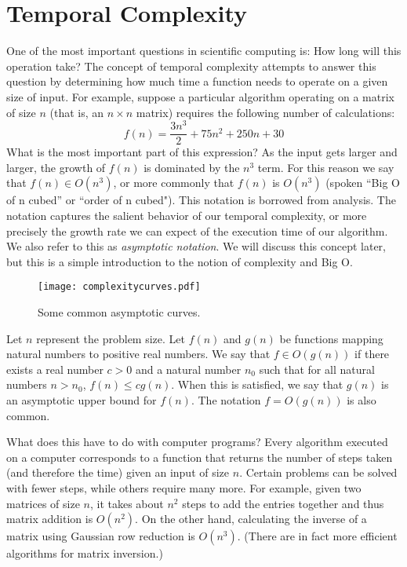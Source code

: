 

\section*{Temporal Complexity}
One of the most important questions in scientific computing is:
How long will this operation take?
The concept of temporal complexity attempts to answer this question by determining
how much time a function needs to operate on a given size of input.
For example, suppose a particular algorithm operating on a matrix of size $n$
(that is, an $n \times n$ matrix)
requires the following number of calculations:
\begin{equation*}
f(n) = \frac{3n^3}{2} + 75n^2 + 250n + 30
\end{equation*}
What is the most important part of this expression?
As the input gets larger and larger, the growth of $f(n)$ is dominated by the $n^3$ term.
For this reason we say that $f(n) \in O(n^3)$, or more commonly that $f(n)$ is $O(n^3)$
(spoken ``Big O of n cubed'' or ``order of n cubed").
This notation is borrowed from analysis. The notation captures the salient behavior of our temporal complexity,
or more precisely the growth rate we can expect of the execution time of our algorithm.
We also refer to this as \emph{asymptotic notation}.
We will discuss this concept later, but this is a simple introduction to the notion of complexity and Big O.
\begin{figure}[h]
\centering
\texttt{[image: complexitycurves.pdf]}
\caption{Some common asymptotic curves.}
\end{figure}

\begin{definition}
Let $n$ represent the problem size.  Let $f(n)$ and $g(n)$ be functions mapping natural numbers to positive real numbers. We say that $f \in O(g(n))$ if there exists a real
number $c > 0$ and a natural number $n_0$ such that for all natural numbers $n > n_0$,
$f(n) \leq cg(n)$.
When this is satisfied, we say that $g(n)$ is an asymptotic upper bound for $f(n)$.
The notation $f = O(g(n))$ is also common.
\end{definition}

What does this have to do with computer programs?
Every algorithm executed on a computer corresponds to a function
that returns the number of steps taken (and therefore the time)
given an input of size $n$.  Certain problems can be solved with fewer steps,
while others require many more.  For example, given two matrices of size $n$,
it takes about $n^2$ steps to add the entries together and thus matrix addition is $O(n^2)$.
On the other hand, calculating the inverse of a matrix using Gaussian
row reduction is $O(n^3)$. (There are in fact more efficient
algorithms for matrix inversion.)

